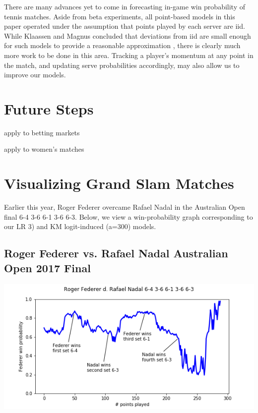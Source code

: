 \documentclass[chapterprefix=false]{report}
\begin{document}
There are many advances yet to come in forecasting in-game win probability of tennis matches. Aside from beta experiments, all point-based models in this paper operated under the assumption that points played by each server are iid. While Klaassen and Magnus concluded that deviations from iid are small enough for such models to provide a reasonable approximation \cite{KlaassenandMagnus2001}, there is clearly much more work to be done in this area. Tracking a player's momentum at any point in the match, and updating serve probabilities accordingly, may also allow us to improve our models.



\section{Future Steps}

apply to betting markets

apply to women's matches

\section{Visualizing Grand Slam Matches}

Earlier this year, Roger Federer overcame Rafael Nadal in the Australian Open final 6-4 3-6 6-1 3-6 6-3. Below, we view a win-probability graph corresponding to our LR 3) and KM logit-induced (a=300) models.

\subsection{Roger Federer vs. Rafael Nadal Australian Open 2017 Final}

\includegraphics[scale=.7]{federer_nadal_ao_17}
\end{document}
